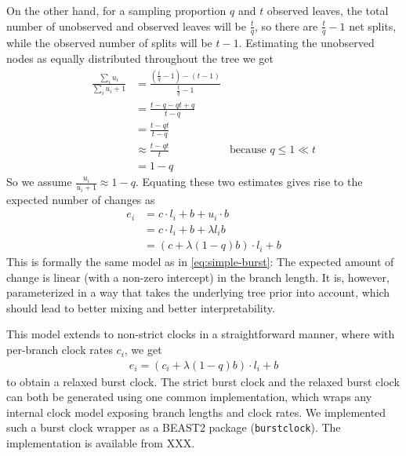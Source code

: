 \documentclass[]{rsos}%
\begin{document}
On the other hand, for a sampling proportion $q$ and $t$ observed leaves, the total number of unobserved and observed leaves will be
$\frac{t}{q}$, so there are $\frac{t}{q} - 1$ net splits,
while the observed number of splits will be $t - 1$.
Estimating the unobserved nodes as equally distributed throughout the tree we get
\begin{align}
  \frac{\sum_i u_i}{\sum_i u_i + 1} & = \frac{(\frac{t}{q} - 1) - (t - 1)}{\frac{t}{q} -1} \\
  & = \frac{t - q - qt + q}{t - q} \\
  & = \frac{t - qt}{t - q} \\
  & \approx \frac{t - qt}{t} &\text{because } q \leq 1 \ll t \\
  & = 1 - q
\end{align}
So we assume $\frac{u_i}{u_i + 1} \approx 1-q$.
Equating these two estimates gives rise to the expected number of changes as
\begin{align}
  e_i &= c \cdot l_i + b + u_i \cdot b  \\
  &= c \cdot l_i + b + \lambda l_i b \\
  &= (c + \lambda (1-q) b) \cdot l_i + b
  \label{eq:reparam-burst}
\end{align}
This is formally the same model as in \cref{eq:simple-burst}: The expected amount of change is linear (with a non-zero intercept) in the branch length. It is, however, parameterized
in a way that takes the underlying tree prior into account,
which should lead to better mixing and better interpretability.

This model extends to non-strict clocks in a straightforward manner, where with per-branch clock rates $c_i$, we get
\begin{align}
  e_i = (c_i + \lambda (1-q) b) \cdot l_i + b
  \label{eq:relaxed}
\end{align}
to obtain a relaxed burst clock.
The strict burst clock and the relaxed burst clock can both be generated using one common implementation, which wraps any internal clock model exposing branch lengths and clock rates.
We implemented such a burst clock wrapper as a BEAST2 package (\texttt{burstclock}).
The implementation is available from XXX.
\end{document}
